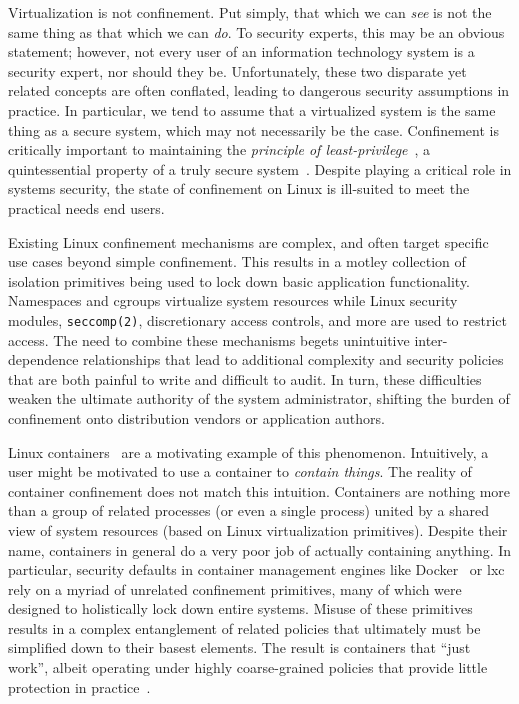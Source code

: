 Virtualization is not confinement. Put simply, that which we can \textit{see} is not the
same thing as that which we can \textit{do}. To security experts, this may be an obvious
statement; however, not every user of an information technology system is a security
expert, nor should they be. Unfortunately, these two disparate yet related concepts are
often conflated, leading to dangerous security assumptions in practice. In particular, we
tend to assume that a virtualized system is the same thing as a secure system, which may
not necessarily be the case. Confinement is critically important to maintaining the
\textit{principle of least-privilege}~\cite{schneider03_least_privilege}, a quintessential
property of a truly secure system~\cite{van_oorschot2020_tools_jewels}. Despite playing
a critical role in systems security, the state of confinement on Linux is ill-suited to
meet the practical needs end users.

Existing Linux confinement mechanisms are complex, and often target specific use cases
beyond simple confinement. This results in a motley collection of isolation primitives
being used to lock down basic application functionality. Namespaces and cgroups virtualize
system resources while Linux security modules, \texttt{seccomp(2)}, discretionary access
controls, and more are used to restrict access. The need to combine these mechanisms
begets unintuitive inter-dependence relationships that lead to additional complexity and
security policies that are both painful to write and difficult to audit. In turn, these
difficulties weaken the ultimate authority of the system administrator, shifting the
burden of confinement onto distribution vendors or application authors.

Linux containers~\cite{docker_security, lxc_security, lin2018_container_security,
sultan2019_container_security} are a motivating example of this phenomenon. Intuitively,
a user might be motivated to use a container to \textit{contain things}. The reality of
container confinement does not match this intuition. Containers are nothing more than
a group of related processes (or even a single process) united by a shared view of system
resources (based on Linux virtualization primitives). Despite their name, containers in
general do a very poor job of actually containing anything. In particular, security
defaults in container management engines like Docker~\cite{docker_security} or
\gls{lxc}~\cite{lxc_security} rely on a myriad of unrelated confinement primitives, many
of which were designed to holistically lock down entire systems. Misuse of these
primitives results in a complex entanglement of related policies that ultimately must be
simplified down to their basest elements. The result is containers that \enquote{just
work}, albeit operating under highly coarse-grained policies that provide little
protection in practice~\cite{sultan2019_container_security, lin2018_container_security}.

